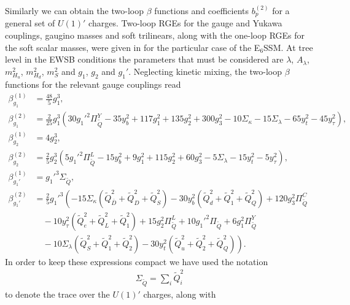 \documentclass[preprint,amsmath,amssymb,aps,superscriptaddress,prd,showpacs,floatfix,nofootinbib]{revtex4-1}
\begin{document}
Similarly we can obtain the two-loop $\beta$ functions and
coefficients $b_p^{(2)}$ for a general set of $U(1)'$
charges. Two-loop RGEs for the gauge and Yukawa couplings, gaugino
masses and soft trilinears, along with the one-loop RGEs for the soft
scalar masses, were given in \cite{Athron:2009bs} for the particular
case of the E$_6$SSM. At tree level in the EWSB conditions the
parameters that must be considered are $\lambda$, $A_\lambda$,
$m_{H_u}^2$, $m_{H_d}^2$, $m_S^2$ and $g_1$, $g_2$ and $g_1'$. Neglecting kinetic
mixing, the two-loop $\beta$ functions for the relevant gauge couplings read
\begin{subequations}\label{eq:USSMGaugeBetas}
\begin{align}
\beta_{g_1}^{(1)}&=\frac{48}{5}g_1^3,\label{eq:USSMg1BetaOneLoop}\\
\beta_{g_1}^{(2)}&=\frac{2}{25} g_1^3 \left(30 g_1'^2 \Pi_{\tilde{Q}}^Y-35 y_b^2+117 g_1^2+135 g_2^2+300 g_3^2-10 \Sigma _{\kappa }-15
   \Sigma _{\lambda }-65 y_t^2-45 y_{\tau }^2\right),\label{eq:USSMg1BetaTwoLoop}\\
\beta_{g_2}^{(1)}&=4g_2^3,\label{eq:USSMg2BetaOneLoop}\\
\beta_{g_2}^{(2)}&=\frac{2}{5} g_2^3 \left(5 g_1'^2 \Pi _{\tilde{Q}}^L-15 y_b^2+9 g_1^2+115 g_2^2+60 g_3^2-5 \Sigma _{\lambda }-15
   y_t^2-5 y_{\tau }^2\right),\label{eq:USSMg2BetaTwoLoop}\\
\beta_{g_1'}^{(1)}&=g_1'^3\Sigma_{\tilde{Q}},\label{eq:USSMg1pBetaOneLoop}\\
\beta_{g_1'}^{(2)}&=\frac{2}{5} g_1'^3 \left(-15 \Sigma _{\kappa } \left(\tilde{Q}_{\bar{D}}^2+\tilde{Q}_D^2+\tilde{Q}_S^2\right)-30
   y_b^2 \left(\tilde{Q}_d^2+\tilde{Q}_1^2+\tilde{Q}_Q^2\right)+120 g_3^2 \Pi _{\tilde{Q}}^C\right.\nonumber \\
&\quad{}-10 y_{\tau }^2
   \left(\tilde{Q}_e^2+\tilde{Q}_L^2+\tilde{Q}_1^2\right)+15 g_2^2 \Pi _{\tilde{Q}}^L+10 g_1'^2 \Pi _{\tilde{Q}}+6
   g_1^2 \Pi _{\tilde{Q}}^Y\nonumber\\
&\quad\left.{}-10 \Sigma _{\lambda } \left(\tilde{Q}_S^2+\tilde{Q}_1^2+\tilde{Q}_2^2\right)-30 y_t^2
   \left(\tilde{Q}_u^2+\tilde{Q}_2^2+\tilde{Q}_Q^2\right)\right).\label{eq:USSMg1pBetaTwoLoop}
\end{align}
\end{subequations}
In order to keep these expressions compact we have used the notation
\begin{align*}
\Sigma_{\tilde{Q}}=\sum_i \tilde{Q}_i^2
\end{align*}
to denote the trace over the $U(1)'$ charges, along with
\end{document}
